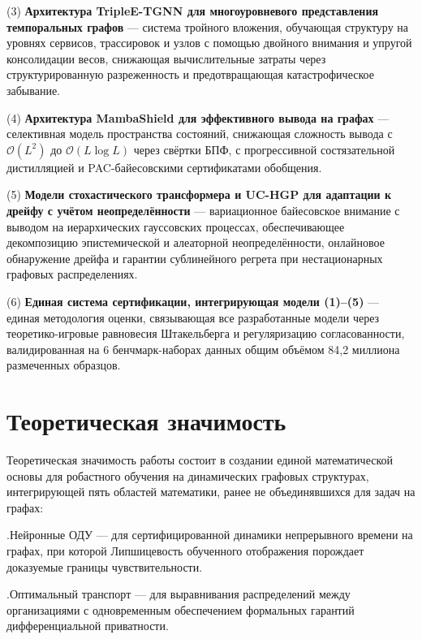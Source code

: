 (3) \textbf{Архитектура TripleE-TGNN для многоуровневого представления темпоральных графов} --- система тройного вложения, обучающая структуру на уровнях сервисов, трассировок и узлов с помощью двойного внимания и упругой консолидации весов, снижающая вычислительные затраты через структурированную разреженность и предотвращающая катастрофическое забывание.

(4) \textbf{Архитектура MambaShield для эффективного вывода на графах} --- селективная модель пространства состояний, снижающая сложность вывода с $\mathcal{O}(L^{2})$ до $\mathcal{O}(L\log L)$ через свёртки БПФ, с прогрессивной состязательной дистилляцией и PAC-байесовскими сертификатами обобщения.

(5) \textbf{Модели стохастического трансформера и UC-HGP для адаптации к дрейфу с учётом неопределённости} --- вариационное байесовское внимание с выводом на иерархических гауссовских процессах, обеспечивающее декомпозицию эпистемической и алеаторной неопределённости, онлайновое обнаружение дрейфа и гарантии сублинейного регрета при нестационарных графовых распределениях.

(6) \textbf{Единая система сертификации, интегрирующая модели (1)--(5)} --- единая методология оценки, связывающая все разработанные модели через теоретико-игровые равновесия Штакельберга и регуляризацию согласованности, валидированная на 6 бенчмарк-наборах данных общим объёмом 84,2 миллиона размеченных образцов.


\section*{Теоретическая значимость}

Теоретическая значимость работы состоит в создании единой математической основы для робастного обучения на динамических графовых структурах, интегрирующей пять областей математики, ранее не объединявшихся для задач на графах:

.\quad Нейронные ОДУ --- для сертифицированной динамики непрерывного времени на графах, при которой Липшицевость обученного отображения порождает доказуемые границы чувствительности.

.\quad Оптимальный транспорт --- для выравнивания распределений между организациями с одновременным обеспечением формальных гарантий дифференциальной приватности.

